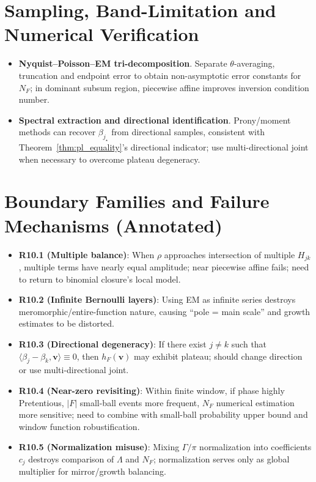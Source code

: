 \documentclass[11pt,a4paper]{article}
\theoremstyle{remark}
\begin{document}
\section{Sampling, Band-Limitation and Numerical Verification}

\begin{itemize}
\item \textbf{Nyquist--Poisson--EM tri-decomposition}. Separate $\theta$-averaging, truncation and endpoint error to obtain non-asymptotic error constants for $N_F$; in dominant subsum region, piecewise affine improves inversion condition number.

\item \textbf{Spectral extraction and directional identification}. Prony/moment methods can recover $\beta_{j_\star}$ from directional samples, consistent with Theorem~\ref{thm:pl_equality}'s directional indicator; use multi-directional joint when necessary to overcome plateau degeneracy.
\end{itemize}

\section{Boundary Families and Failure Mechanisms (Annotated)}

\begin{itemize}
\item \textbf{R10.1 (Multiple balance)}: When $\rho$ approaches intersection of multiple $H_{jk}$, multiple terms have nearly equal amplitude; near piecewise affine fails; need to return to binomial closure's local model.

\item \textbf{R10.2 (Infinite Bernoulli layers)}: Using EM as infinite series destroys meromorphic/entire-function nature, causing ``pole = main scale'' and growth estimates to be distorted.

\item \textbf{R10.3 (Directional degeneracy)}: If there exist $j\ne k$ such that $\langle\beta_j-\beta_k,\mathbf{v}\rangle\equiv0$, then $h_F(\mathbf{v})$ may exhibit plateau; should change direction or use multi-directional joint.

\item \textbf{R10.4 (Near-zero revisiting)}: Within finite window, if phase highly Pretentious, $|F|$ small-ball events more frequent, $N_F$ numerical estimation more sensitive; need to combine with small-ball probability upper bound and window function robustification.

\item \textbf{R10.5 (Normalization misuse)}: Mixing $\Gamma/\pi$ normalization into coefficients $c_j$ destroys comparison of $\Lambda$ and $N_F$; normalization serves only as global multiplier for mirror/growth balancing.
\end{itemize}
\end{document}
